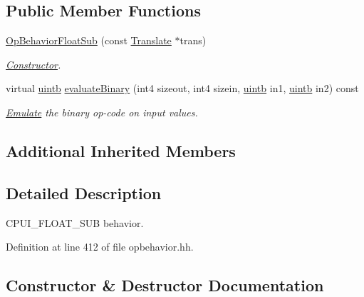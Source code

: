 \subsection*{Public Member Functions}
\begin{DoxyCompactItemize}
\item 
\mbox{\hyperlink{class_op_behavior_float_sub_a23deff6b908b484e4623844a1e1fd6d9}{Op\+Behavior\+Float\+Sub}} (const \mbox{\hyperlink{class_translate}{Translate}} $\ast$trans)
\begin{DoxyCompactList}\small\item\em \mbox{\hyperlink{class_constructor}{Constructor}}. \end{DoxyCompactList}\item 
virtual \mbox{\hyperlink{types_8h_a2db313c5d32a12b01d26ac9b3bca178f}{uintb}} \mbox{\hyperlink{class_op_behavior_float_sub_a8cb6e6a90386469b69c4c92d39ded928}{evaluate\+Binary}} (int4 sizeout, int4 sizein, \mbox{\hyperlink{types_8h_a2db313c5d32a12b01d26ac9b3bca178f}{uintb}} in1, \mbox{\hyperlink{types_8h_a2db313c5d32a12b01d26ac9b3bca178f}{uintb}} in2) const
\begin{DoxyCompactList}\small\item\em \mbox{\hyperlink{class_emulate}{Emulate}} the binary op-\/code on input values. \end{DoxyCompactList}\end{DoxyCompactItemize}
\subsection*{Additional Inherited Members}


\subsection{Detailed Description}
C\+P\+U\+I\+\_\+\+F\+L\+O\+A\+T\+\_\+\+S\+UB behavior. 

Definition at line 412 of file opbehavior.\+hh.



\subsection{Constructor \& Destructor Documentation}
\mbox{\label{class_op_behavior_float_sub_a23deff6b908b484e4623844a1e1fd6d9}} 
